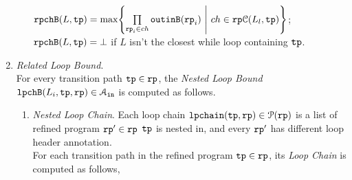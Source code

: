 \begin{enumerate}
\begin{enumerate}
  \\
  $\rpchB(L, \tpath) = \max \left\{ \prod\limits_{\rprog_i \in ch}  \outinB(\rprog_i) 
  ~\middle\vert~ ch \in \rpchset(L_l, \tpath) \right\}
  $;
  \\
  $\mathtt{rpchB}(L, \mathtt{tp}) = \bot$ if $L$ isn't the closest while loop containing $\mathtt{tp}$.
  \end{enumerate}
%
\item \emph{Related Loop Bound}.
\\
For every transition path $\mathtt{tp} \in \mathtt{rp}$, 
the \emph{Nested Loop Bound} $\mathtt{lpchB}(L_i, \mathtt{tp}, \mathtt{rp}) \in \mathcal{A}_{\mathtt{in}}$ is computed as follows.
\begin{enumerate}
  \item \emph{Nested Loop Chain}.
  Each loop chain $\mathtt{lpchain}(\mathtt{tp}, \mathtt{rp}) \in \mathcal{P}(\mathtt{rp})$ 
  is a list of refined program $\mathtt{rp}' \in \mathtt{rp}$
  $\mathtt{tp}$ is nested in, and every $\mathtt{rp}'$ has different loop header annotation.
  \\
For each transition path in the refined program $\mathtt{tp} \in \mathtt{rp}$, 
its \emph{Loop Chain} is computed as follows,
\begin{defn}
  \label{def:loopchain}

\end{defn}
\end{enumerate}
\end{enumerate}
